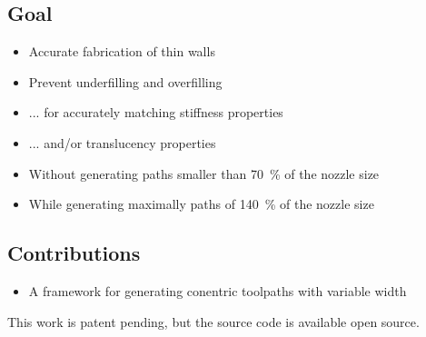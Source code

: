 \iffalse

``Small bead width increases build time. Small bead width increases surfacequality.''\cite{ahn2002anisotropic}

``The final width of the road determines the resolution that can be achieved in the print process, as well as the contactarea between neighboring beads.  The rounded, oblong shape of  the  bead  inevitably  leads  to  small  voids  in  the  part.  The strength   of   the   bond   between   neighboring   roads,   and ultimately the overall mechanical properties of the part, will depend on the contact area between those beads and the size of the voids.''\cite{N.Turner2014}
\fi



\subsection{Goal}
\begin{itemize}
\item Accurate fabrication of thin walls
\item Prevent underfilling and overfilling
\item ... for accurately matching stiffness properties
\item ... and/or translucency properties
\item Without generating paths smaller than \SI{70}{\percent} of the nozzle size
\item While generating maximally paths of \SI{140}{\percent} of the nozzle size
\end{itemize}



\subsection{Contributions}
\begin{itemize}
\item A framework for generating conentric toolpaths with variable width
\end{itemize}

This work is patent pending, but the source code is available open source.


